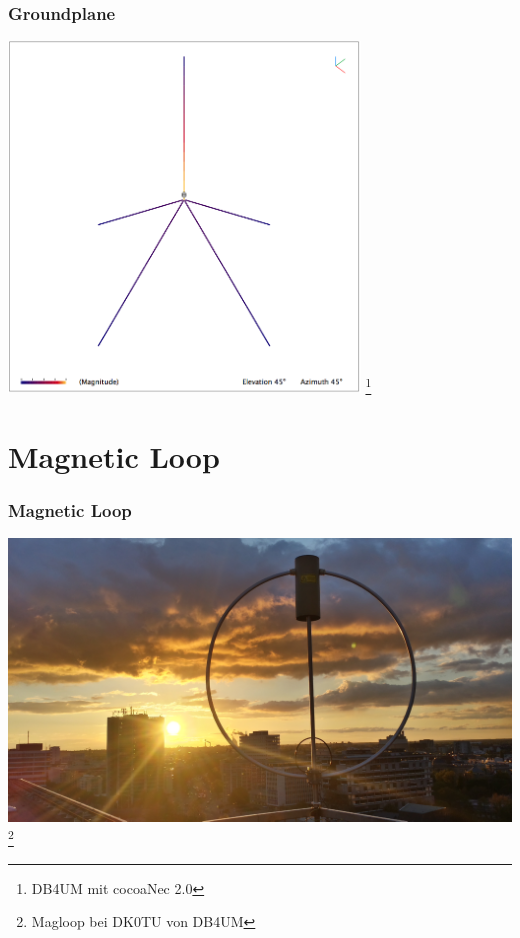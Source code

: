 \begin{frame}
    \frametitle{Groundplane}
    \begin{center}
        \includegraphics[width=0.7\textwidth]{e11/GP-DB4UM.png}
        \footnote{\tiny DB4UM mit cocoaNec 2.0}
	\end{center}
\end{frame}

\section*{Magnetic Loop}

\begin{frame}
    \frametitle{Magnetic Loop}
    \begin{center}
        \includegraphics[width=1\textwidth]{e11/Magloop.jpg}
        \footnote{\tiny Magloop bei DK0TU von DB4UM}
	\end{center}
\end{frame}

